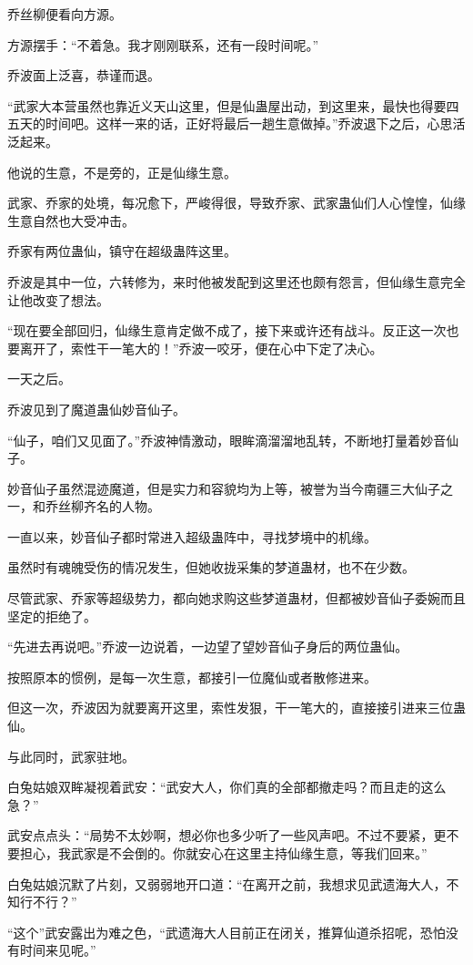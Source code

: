 \begin{this_body}
乔丝柳便看向方源。

方源摆手：“不着急。我才刚刚联系，还有一段时间呢。”

乔波面上泛喜，恭谨而退。

“武家大本营虽然也靠近义天山这里，但是仙蛊屋出动，到这里来，最快也得要四五天的时间吧。这样一来的话，正好将最后一趟生意做掉。”乔波退下之后，心思活泛起来。

他说的生意，不是旁的，正是仙缘生意。

武家、乔家的处境，每况愈下，严峻得很，导致乔家、武家蛊仙们人心惶惶，仙缘生意自然也大受冲击。

乔家有两位蛊仙，镇守在超级蛊阵这里。

乔波是其中一位，六转修为，来时他被发配到这里还也颇有怨言，但仙缘生意完全让他改变了想法。

“现在要全部回归，仙缘生意肯定做不成了，接下来或许还有战斗。反正这一次也要离开了，索性干一笔大的！”乔波一咬牙，便在心中下定了决心。

一天之后。

乔波见到了魔道蛊仙妙音仙子。

“仙子，咱们又见面了。”乔波神情激动，眼眸滴溜溜地乱转，不断地打量着妙音仙子。

妙音仙子虽然混迹魔道，但是实力和容貌均为上等，被誉为当今南疆三大仙子之一，和乔丝柳齐名的人物。

一直以来，妙音仙子都时常进入超级蛊阵中，寻找梦境中的机缘。

虽然时有魂魄受伤的情况发生，但她收拢采集的梦道蛊材，也不在少数。

尽管武家、乔家等超级势力，都向她求购这些梦道蛊材，但都被妙音仙子委婉而且坚定的拒绝了。

“先进去再说吧。”乔波一边说着，一边望了望妙音仙子身后的两位蛊仙。

按照原本的惯例，是每一次生意，都接引一位魔仙或者散修进来。

但这一次，乔波因为就要离开这里，索性发狠，干一笔大的，直接接引进来三位蛊仙。

与此同时，武家驻地。

白兔姑娘双眸凝视着武安：“武安大人，你们真的全部都撤走吗？而且走的这么急？”

武安点点头：“局势不太妙啊，想必你也多少听了一些风声吧。不过不要紧，更不要担心，我武家是不会倒的。你就安心在这里主持仙缘生意，等我们回来。”

白兔姑娘沉默了片刻，又弱弱地开口道：“在离开之前，我想求见武遗海大人，不知行不行？”

“这个”武安露出为难之色，“武遗海大人目前正在闭关，推算仙道杀招呢，恐怕没有时间来见呢。”


\end{this_body}
